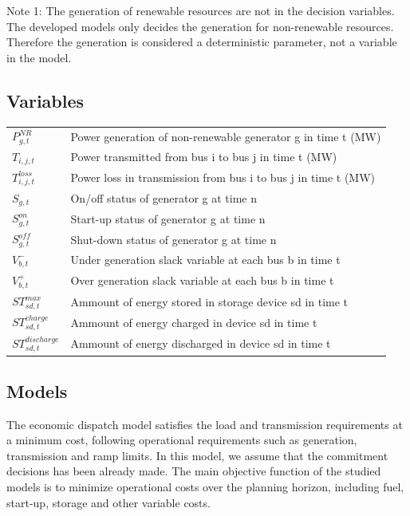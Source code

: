 \documentclass[12pt,LUDisStyle,twosided]{book}
\begin{document}
Note 1: The generation of renewable resources are not in the decision variables. The developed models only decides the generation for non-renewable resources. Therefore the generation is considered a deterministic parameter, not a variable in the model.

\subsection{Variables}

\begin{tabular}{ll}

$P^{NR}_{g,t} $& Power generation of non-renewable generator g in time t (MW)\\
$T_{i,j,t} $& Power transmitted from bus i to bus j in time t (MW)\\
$T^{loss}_{i,j,t} $& Power loss in transmission from bus i to bus j in time t (MW)\\
$S_{g,t} $& On/off status of generator g at time n\\
$S^{on}_{g,t} $& Start-up status of generator g at time n\\
$S^{off}_{g,t} $& Shut-down status of generator g at time n\\
$V^{-}_{b,t} $& Under generation slack variable at each bus b in time t\\
$V^{+}_{b,t} $& Over generation slack variable at each bus b in time t\\
$ST^{max}_{sd,t} $& Ammount of energy stored in storage device sd in time t\\
$ST^{charge}_{sd,t} $& Ammount of energy charged in device sd in time t\\
$ST^{discharge}_{sd,t} $& Ammount of energy discharged in device sd in time t\\

\end{tabular}

\subsection{Models}

The economic dispatch model satisfies the load and transmission requirements at a minimum cost, following operational requirements such as generation, transmission and ramp limits. In this model, we assume that the commitment decisions has been already made. The main objective function of the studied models is to minimize operational costs over the planning horizon, including fuel, start-up, storage and other variable costs.
\end{document}
